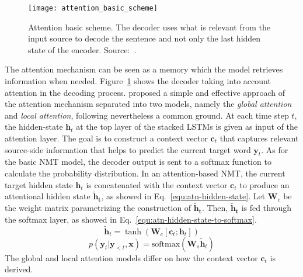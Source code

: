\begin{figure}
    \centering
    \texttt{[image: attention\_basic\_scheme]}
    \decoRule
    \caption[Attention basic scheme]{Attention basic scheme. The decoder uses what is relevant from the input source to decode the sentence and not only the last hidden state of the encoder. Source:~\citet{youtube-nmt-attention}.}
    \label{fig:attention_basic_scheme}
\end{figure}

The attention mechanism can be seen as a memory which the model retrieves information when needed. Figure~\ref{fig:attention_basic_scheme} shows the decoder taking into account attention in the decoding process.
\citet{1508.04025} proposed a simple and effective approach of the attention mechanism separated into two models, namely the \textit{global attention} and \textit{local attention}, following nevertheless a common ground.
At each time step $t$, the hidden-state $\bm{h}_t$ at the top layer of the stacked LSTMs is given as input of the attention layer.
The goal is to construct a context vector $\bm{c}_t$ that captures relevant source-side information that helps to predict the current target word $\bm{y}_t$. As for the basic NMT model, the decoder output is sent to a softmax function to calculate the probability distribution.
In an attention-based NMT, the current target hidden state $\bm{h}_t$ is concatenated with the context vector $\bm{c}_t$ to produce an attentional hidden state $\bm{\tilde{h}_t}$, as showed in Eq.~\ref{equ:atn-hidden-state}. Let $\mathbf{W}_c$ be the weight matrix parametrizing the construction of $\bm{\tilde{h}_t}$.
Then, $\bm{\tilde{h}_t}$ is fed through the softmax layer, as showed in Eq.~\ref{equ:atn-hidden-state-to-softmax}.
\begin{equation}
    \bm{\tilde{h}}_t = \tanh ( \mathbf{W}_c [\bm{c}_t;\bm{h}_t])
    \label{equ:atn-hidden-state}
\end{equation}
\begin{equation}
    p( \bm{y}_t | \bm{y}_{<t}, \bm{x}) = \mathrm{softmax}(\mathbf{W}_s \bm{\tilde{h}}_t)
    \label{equ:atn-hidden-state-to-softmax}
\end{equation}
 The global and local attention models differ on how the context vector $\bm{c}_t$ is derived.

